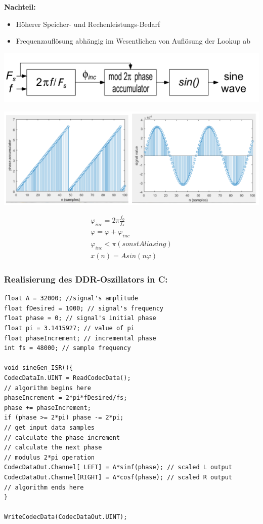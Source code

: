 \documentclass[10pt,a4paper]{article}
\begin{document}
\textbf{Nachteil:}
\begin{itemize}
  \item Höherer Speicher- und Rechenleistungs-Bedarf
  \item Frequenzauflösung abhängig im Wesentlichen von Auflösung der Lookup ab
\end{itemize}  

\begin{center}
  \includegraphics[width=.5\textwidth]{./img/DDS_sin().png}
\end{center} 

\begin{center}
  \includegraphics[width=.5\textwidth]{./img/sin_phaseincrement.png}
\end{center} 

  \begin{mdframed}[style=exercise]
    \begin{align}
        \varphi_{inc} = 2\pi\frac{f_0}{f_s}\\
        \varphi = \varphi + \varphi_{inc}\\
        \varphi_{inc} < \pi (sonst Aliasing)\\
        x(n)= Asin(n\varphi)
    \end{align}
  \end{mdframed}

\subsubsection{Realisierung des DDR-Oszillators in C:}
\begin{verbatim}
float A = 32000; //signal's amplitude 
float fDesired = 1000; // signal's frequency 
float phase = 0; // signal's initial phase 
float pi = 3.1415927; // value of pi 
float phaseIncrement; // incremental phase 
int fs = 48000; // sample frequency 

void sineGen_ISR(){
CodecDataIn.UINT = ReadCodecData();
// algorithm begins here 
phaseIncrement = 2*pi*fDesired/fs;
phase += phaseIncrement;
if (phase >= 2*pi) phase -= 2*pi;
// get input data samples
// calculate the phase increment 
// calculate the next phase 
// modulus 2*pi operation 
CodecDataOut.Channel[ LEFT] = A*sinf(phase); // scaled L output 
CodecDataOut.Channel[RIGHT] = A*cosf(phase); // scaled R output 
// algorithm ends here 
}

WriteCodecData(CodecDataOut.UINT);
\end{verbatim}
\end{document}

